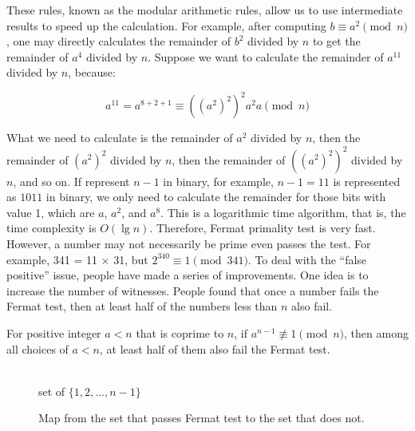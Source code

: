 \documentclass[b5paper]{article}
\begin{document}
These rules, known as the modular arithmetic rules, allow us to use intermediate results to speed up the calculation. For example, after computing $b \equiv a^2 \pmod{n}$, one may directly calculates the remainder of $b^2$ divided by $n$ to get the remainder of $a^4$ divided by $n$. Suppose we want to calculate the remainder of $a^{11}$ divided by $n$, because:

\[
a^{11} = a^{8 + 2 + 1} \equiv ((a^2)^2)^2a^2a \pmod{n}
\]

What we need to calculate is the remainder of $a^2$ divided by $n$, then the remainder of $(a^2)^2$ divided by $n$, then the remainder of $((a^2)^2)^2$ divided by $n$, and so on. If represent $n - 1$ in binary, for example, $n - 1 = 11$ is represented as $1011$ in binary, we only need to calculate the remainder for those bits with value 1, which are $a$, $a^2$, and $a^8$. This is a logarithmic time algorithm, that is, the time complexity is $O(\lg n)$. Therefore, Fermat primality test is very fast. However, a number may not necessarily be prime even passes the test. For example, 341 = 11 $\times$ 31, but $2^{340} \equiv 1 \pmod{341}$. To deal with the \enquote{false positive} issue, people have made a series of improvements. One idea is to increase the number of witnesses. People found that once a number fails the Fermat test, then at least half of the numbers less than $n$ also fail.

\begin{proposition} \label{thm:fermat-test}
For positive integer $a < n$ that is coprime to $n$, if $a^{n-1} \not\equiv 1 \pmod n$, then among all choices of $a < n$, at least half of them also fail the Fermat test.
\end{proposition}

\begin{figure}[htbp]
\centering
{} \\
set of $\{1, 2, ..., n-1\}$
\caption{Map from the set that passes Fermat test to the set that does not.}
\label{fig:Fermat-test}
\end{figure}
\end{document}
